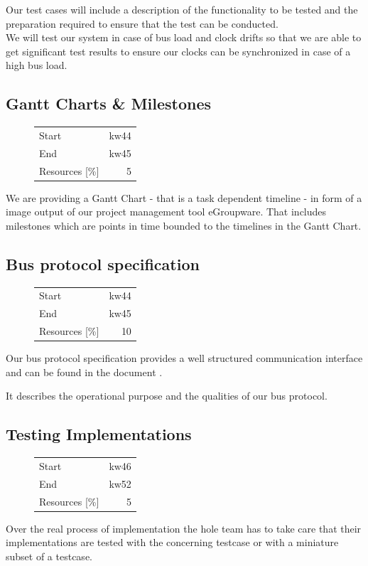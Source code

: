 Our test cases will include a description of the functionality to be tested and the preparation required
to ensure that the test can be conducted.\\
We will test our system in case of bus load and clock drifts so that we are able to get
significant test results to ensure our clocks can be synchronized in case of a high bus load.

\subsection{Gantt Charts \& Milestones}
\begin{figure}
\begin{tabular}[t]{|lr|}
\hline
Start & kw44\\
End & kw45\\
Resources [\%] & 5\\
\hline
\end{tabular}
\end{figure}
We are providing a Gantt Chart - that is a task dependent timeline - in form of a image output of our 
project management tool eGroupware. That includes milestones which are points 
in time bounded to the timelines in the Gantt Chart.
\subsection{Bus protocol specification}
\begin{figure}
\begin{tabular}[t]{|lr|}
\hline
Start & kw44\\
End & kw45\\
Resources [\%] & 10\\
\hline
\end{tabular}
\end{figure}
Our bus protocol specification provides a well structured communication interface and can be found in the document \cite [NESD2]{NESD2}.

It describes the operational purpose and the qualities of our bus protocol.
\subsection{Testing Implementations}
\begin{figure}
\begin{tabular}[t]{|lr|}
\hline
Start & kw46\\
End & kw52\\
Resources [\%] & 5\\
\hline
\end{tabular}
\end{figure}
Over the real process of implementation the hole team has to take care that their 
implementations are tested with the concerning testcase or with a miniature subset of a testcase.\\

